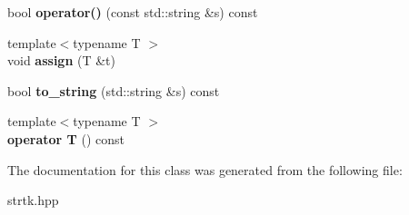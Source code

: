 \begin{DoxyCompactItemize}
\item 
\hypertarget{classstrtk_1_1util_1_1value_a60be9f5966bc8bbcb5262cf547a71051}{bool {\bfseries operator()} (const std\-::string \&s) const }\label{classstrtk_1_1util_1_1value_a60be9f5966bc8bbcb5262cf547a71051}

\item 
\hypertarget{classstrtk_1_1util_1_1value_a54715bad0a995bd9a6701a92addc2354}{{\footnotesize template$<$typename T $>$ }\\void {\bfseries assign} (T \&t)}\label{classstrtk_1_1util_1_1value_a54715bad0a995bd9a6701a92addc2354}

\item 
\hypertarget{classstrtk_1_1util_1_1value_acd6420736a2c20575673c506549f6588}{bool {\bfseries to\-\_\-string} (std\-::string \&s) const }\label{classstrtk_1_1util_1_1value_acd6420736a2c20575673c506549f6588}

\item 
\hypertarget{classstrtk_1_1util_1_1value_a9e2388cb9bfbb48e90558531be4a50c6}{{\footnotesize template$<$typename T $>$ }\\{\bfseries operator T} () const }\label{classstrtk_1_1util_1_1value_a9e2388cb9bfbb48e90558531be4a50c6}

\end{DoxyCompactItemize}


The documentation for this class was generated from the following file\-:\begin{DoxyCompactItemize}
\item 
strtk.\-hpp\end{DoxyCompactItemize}
